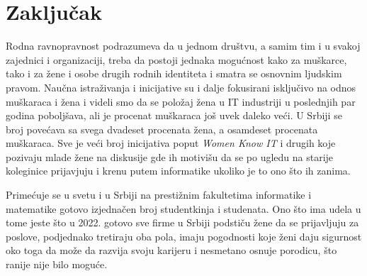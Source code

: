 \section{Zaključak}
\label{sec:zakljucak}
Rodna ravnopravnost podrazumeva da u jednom društvu, a samim tim i u svakoj zajednici i organizaciji, treba da postoji jednaka mogućnost kako za muškarce, tako i za žene i osobe drugih rodnih identiteta i smatra se osnovnim ljudskim pravom. Naučna istraživanja i inicijative su i dalje fokusirani isključivo na odnos muškaraca i žena i videli smo da se položaj žena u IT industriji u poslednjih par godina poboljšava, ali je procenat muškaraca još uvek daleko veći. U Srbiji se broj povećava sa svega dvadeset procenata žena, a osamdeset procenata muškaraca. Sve je veći broj inicijativa poput \emph{Women Know IT} i drugih koje pozivaju mlade žene na diskusije gde ih motivišu da se po ugledu na starije koleginice prijavjuju i krenu putem informatike ukoliko je to ono što ih zanima. 

Primećuje se u svetu i u Srbiji na prestižnim fakultetima informatike i matematike gotovo izjednačen broj studentkinja i studenata. Ono što ima udela u tome jeste što u 2022. gotovo sve firme u Srbiji podstiču žene da se prijavljuju za poslove, podjednako tretiraju oba pola, imaju pogodnosti koje ženi daju sigurnost oko toga da može da razvija svoju karijeru i nesmetano osnuje porodicu, što ranije nije bilo moguće. 